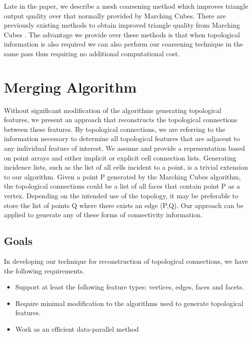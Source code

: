 \documentclass[10pt,journal,cspaper,compsoc]{IEEEtran}
\begin{document}
Late in the paper, we describe a mesh coarsening method which improves triangle output quality over that normally provided by Marching Cubes. There are previously existing methods to obtain improved triangle quality from Marching Cubes \cite{Moore_Warren_1991}. The advantage we provide over these methods is that when topological information is also required we can also perform our coarsening technique in the same pass thus requiring no additional computational cost. 

\section{Merging Algorithm}
Without significant modification of the algorithms generating topological features,
we present an approach that reconstructs the topological connections
between these features. By topological connections, we are referring to the information necessary to
determine all topological features that are adjacent to any individual feature of 
interest. We assume and provide a representation based on point arrays and either implicit or explicit cell connection lists. Generating incidence lists, such as the list of all cells incident to a point, is a trivial extension to our algorithm. Given a point P 
generated by the Marching Cubes algorithm, the topological connections
could be a list of all faces that contain point P as a vertex. Depending on
the intended use of the topology, it may be preferable to store the list of
points Q where there exists an edge (P,Q). Our approach can be applied
to generate any of these forms of connectivity information.

\subsection{Goals}
In developing our technique for reconstruction of topological connections, we have the
following requirements.
\begin{itemize}
	\item{Support at least the following feature types: vertices, edges, faces and facets.}

	\item{Require minimal modification to the algorithms used to generate topological features.}

	\item{Work as an efficient data-parallel method}
 
\end{itemize}
\end{document}
